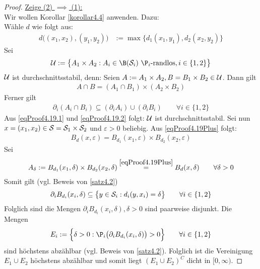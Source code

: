 \begin{proof}
	\underline{Zeige (2) $\implies$ (1):}\\
	Wir wollen Korollar \ref{korollar4.4} anwenden. Dazu:\\
	Wähle $d$ wie folgt aus:
	\begin{align}\label{eqProof4.19Plus}\tag{+}
		d\big((x_1,x_2),(y_1,y_2)\big)&:=\max\big\lbrace d_1(x_1,y_1),d_2(x_2,y_2)\big\rbrace
	\end{align}
	Sei
	\begin{align*}
		\U:=\big\lbrace A_1\times A_2:A_i\in\B(\S_i)~\P_i\text{-randlos}, i\in\lbrace1,2\rbrace\big\rbrace 
	\end{align*}
	$\U$ ist durchschnittsstabil, denn: 
	Seien $A:=A_1\times A_2,B=B_1\times B_2\in\U$. 
	Dann gilt
	\begin{align}\label{eqProof4.19.1}\tag{1}
		A\cap B=(A_1\cap B_1)\times(A_2\times B_2)
	\end{align}
	Ferner gilt
	\begin{align}\label{eqProof4.19.2}\tag{2}
		\partial_i(A_i\cap B_i)\subseteq(\partial_i A_i)\cup(\partial_i B_i)\qquad\forall i\in\lbrace1,2\rbrace
	\end{align}
	Aus \eqref{eqProof4.19.1} und \eqref{eqProof4.19.2} folgt: 
	$\U$ ist durchschnittsstabil. Sei nun $x=(x_1,x_2)\in\S=\S_1\times\S_2$ und $\varepsilon>0$ beliebig. 
	Aus \eqref{eqProof4.19Plus} folgt:
	\begin{align*}
		B_d(x,\varepsilon)=B_{d_1}(x_1,\varepsilon)\times B_{d_2}(x_2,\varepsilon)
	\end{align*}
	Sei 
	\begin{align*}
		A_\delta:=B_{d_1}(x_1,\delta)\times B_{d_2}(x_2,\delta)
		\stackeq{\eqref{eqProof4.19Plus}} B_d(x,\delta)\qquad\forall\delta>0
	\end{align*}
	Somit gilt (vgl. Beweis von \ref{satz4.2})
	\begin{align*}
		\partial_i B_{d_i}(x_i,\delta)\subseteq\big\lbrace y\in\S_i:d_i(y,x_i)=\delta\big\rbrace\qquad\forall i\in\lbrace1,2\rbrace
	\end{align*}
	Folglich sind die Mengen $\partial_i B_{d_i}(x_i,\delta),\delta>0$ sind paarweise disjunkt. 
	Die Mengen
	\begin{align*}
		E_i:=\Big\lbrace\delta>0:\P_i\big(\partial_i B_{d_i}(x_i,\delta)\big)>0\Big\rbrace\qquad\forall i\in\lbrace1,2\rbrace
	\end{align*}
	sind höchstens abzählbar (vgl. Beweis von \ref{satz4.2}). 
	Folglich ist die Vereinigung $E_1\cup E_2$ höchstens abzählbar und somit liegt $(E_1\cup E_2)^C$ dicht in $[0,\infty)$. 

\end{proof}
